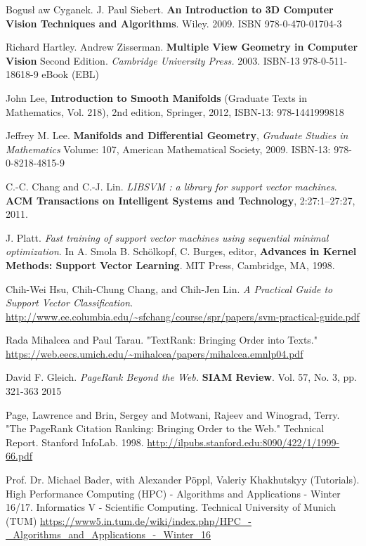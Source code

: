 \documentclass[10pt]{amsart}
\begin{document}
\begin{thebibliography}{9}
Bogus\l{} aw Cyganek.  J. Paul Siebert.  \textbf{An Introduction to 3D Computer Vision Techniques and Algorithms}.  Wiley.  2009.  ISBN 978-0-470-01704-3

Richard Hartley.  Andrew Zisserman.  \textbf{Multiple View Geometry in Computer Vision}  Second Edition.  \emph{Cambridge University Press.}  2003.  ISBN-13 978-0-511-18618-9 eBook (EBL)

John Lee, \textbf{Introduction to Smooth Manifolds} (Graduate Texts in Mathematics, Vol. 218), 2nd edition, Springer,  2012, ISBN-13: 978-1441999818

Jeffrey M. Lee. \textbf{Manifolds and Differential Geometry}, \emph{Graduate Studies in Mathematics} Volume: 107, American Mathematical Society, 2009. ISBN-13: 978-0-8218-4815-9



  C.-C. Chang and C.-J. Lin. \emph{LIBSVM : a library for support vector machines}. \textbf{ACM Transactions on Intelligent Systems and Technology}, 2:27:1--27:27, 2011. 

  J. Platt. \emph{Fast training of support vector machines using sequential minimal optimization}. In A. Smola B. Schölkopf, C. Burges, editor, \textbf{Advances in Kernel Methods: Support Vector Learning}. MIT Press, Cambridge, MA, 1998.

Chih-Wei Hsu, Chih-Chung Chang, and Chih-Jen Lin.  \emph{A Practical Guide to Support Vector Classification}.  \url{http://www.ee.columbia.edu/~sfchang/course/spr/papers/svm-practical-guide.pdf}

Rada Mihalcea and Paul Tarau.  "TextRank: Bringing Order into Texts."  
\url{https://web.eecs.umich.edu/~mihalcea/papers/mihalcea.emnlp04.pdf}  

David F. Gleich.  \emph{PageRank Beyond the Web.}  \textbf{SIAM Review}.  Vol. 57, No. 3, pp. 321-363 2015  
  
Page, Lawrence and Brin, Sergey and Motwani, Rajeev and Winograd, Terry.  "The PageRank Citation Ranking: Bringing Order to the Web." Technical Report. Stanford InfoLab.  1998.  \url{http://ilpubs.stanford.edu:8090/422/1/1999-66.pdf}  
  
Prof. Dr. Michael Bader, with Alexander P\"{o}ppl, Valeriy Khakhutskyy (Tutorials).  High Performance Computing (HPC) - Algorithms and Applications - Winter 16/17.  Informatics V - Scientific Computing.  Technical University of Munich (TUM)
\url{https://www5.in.tum.de/wiki/index.php/HPC_-_Algorithms_and_Applications_-_Winter_16}



\end{thebibliography}
\end{document}
